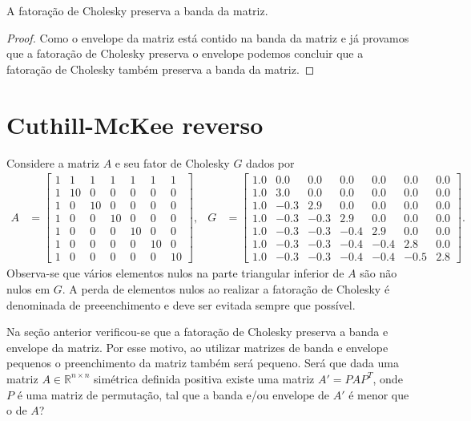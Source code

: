 \begin{prop}
    \label{prop:pres:band}
    A fatoração de Cholesky preserva a banda da matriz.
\end{prop}
\begin{proof}
    Como o envelope da matriz está contido na banda da matriz e já provamos que
    a fatoração de Cholesky preserva o envelope podemos concluir que a fatoração
    de Cholesky também preserva a banda da matriz.
\end{proof}

\section{Cuthill-McKee reverso}
Considere a matriz $A$ e seu fator de Cholesky $G$ dados por
\begin{align*}
    A &= \begin{bmatrix}
        1 &  1 &  1 &  1 &  1 &  1 &  1 \\
        1 & 10 &  0 &  0 &  0 &  0 &  0 \\
        1 &  0 & 10 &  0 &  0 &  0 &  0 \\
        1 &  0 &  0 & 10 &  0 &  0 &  0 \\
        1 &  0 &  0 &  0 & 10 &  0 &  0 \\
        1 &  0 &  0 &  0 &  0 & 10 &  0 \\
        1 &  0 &  0 &  0 &  0 &  0 & 10
    \end{bmatrix}, & G &= \begin{bmatrix}
        1.0 &  0.0 &  0.0 &  0.0 &  0.0 &  0.0 &  0.0 \\
        1.0 &  3.0 &  0.0 &  0.0 &  0.0 &  0.0 &  0.0 \\
        1.0 & -0.3 &  2.9 &  0.0 &  0.0 &  0.0 &  0.0 \\
        1.0 & -0.3 & -0.3 &  2.9 &  0.0 &  0.0 &  0.0 \\
        1.0 & -0.3 & -0.3 & -0.4 &  2.9 &  0.0 &  0.0 \\
        1.0 & -0.3 & -0.3 & -0.4 & -0.4 &  2.8 &  0.0 \\
        1.0 & -0.3 & -0.3 & -0.4 & -0.4 & -0.5 &  2.8
    \end{bmatrix}.
\end{align*}
Observa-se que vários elementos nulos na parte triangular inferior de $A$ são
não nulos em $G$. A perda de elementos nulos ao realizar a fatoração de
Cholesky é denominada de preeenchimento e deve ser evitada sempre que possível.

Na seção anterior verificou-se que a fatoração de Cholesky preserva a banda e
envelope da matriz. Por esse motivo, ao utilizar matrizes de banda e
envelope pequenos o preenchimento da matriz também será pequeno. Será que dada
uma matriz $A \in \mathbb{R}^{n \times n}$ simétrica definida positiva existe
uma matriz $A' = P A P^T$, onde $P$ é uma matriz de permutação, tal que a banda
e/ou envelope de $A'$ é menor que o de $A$?

